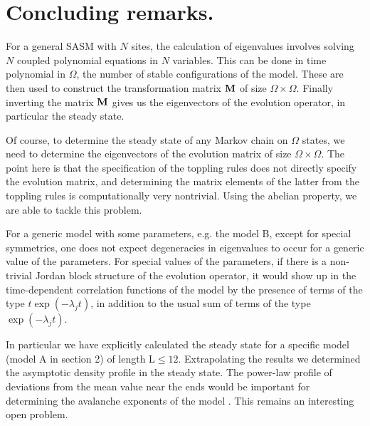 \documentclass[11pt,a4paper]{book}
\begin{document}
\section{Concluding remarks.}\label{sec:ch5.8}
For a general SASM with $N$ sites, the calculation of eigenvalues 
involves solving $N$ coupled polynomial equations in $N$ variables. This 
can be done in time polynomial in $\Omega$, the number of stable 
configurations of the model. These are then used to construct the 
transformation matrix ${\bf M}$ of size $\Omega \times \Omega$. Finally 
inverting the matrix ${\bf M}$ gives us the eigenvectors of the 
evolution operator, in particular the steady state.

Of course, to determine the steady state of any Markov chain on $\Omega$ 
states, we need to determine the eigenvectors of the evolution matrix of 
size $\Omega \times \Omega$. The point here is that the specification of 
the toppling rules does not directly specify the evolution matrix, and 
determining the matrix elements of the latter from the toppling rules is 
computationally very nontrivial. Using  the 
abelian property, we are able to tackle this problem.

For a generic model with some parameters, e.g. the model B, except for 
special symmetries, one does not expect degeneracies in eigenvalues to
occur 
for a generic value of the parameters.  For special values of the 
parameters, if there is a  non-trivial Jordan 
block structure of the evolution operator, it would  show up in the 
time-dependent correlation
functions of the model by the presence of terms of the type $ t \exp( 
-\lambda_j 
t)$, in addition to the usual sum of terms of the type $\exp( 
-\lambda_j 
t)$.


In particular we have
explicitly calculated the steady state for a specific model (model A
in section 2) of length L$\le12$. Extrapolating the results
we determined the asymptotic density profile in the steady state.
The power-law profile of deviations from the mean value near the ends
would be important for determining the avalanche exponents of the model 
\cite{lubeck4}. This remains an interesting open problem.

\appendix
\end{document}
